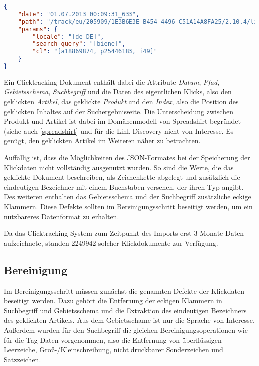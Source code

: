 \begin{lstlisting}[language=json, label={lst:click_raw}, caption={Clicktracking - Rohdokument als JSON}]
{
    "date": "01.07.2013 00:09:31_633",
    "path": "/track/eu/205909/1E3B6E3E-B454-4496-C51A14A8FA25/2.10.4/list",
    "params": {
        "locale": "[de_DE]",
        "search-query": "[biene]",
        "cl": "[a18869874, p25446183, i49]"
    }
}
\end{lstlisting}

Ein Clicktracking-Dokument enthält dabei die Attribute \emph{Datum}, \emph{Pfad}, \emph{Gebietsschema}, \emph{Suchbegriff} und die Daten des eigentlichen Klicks, also den geklickten \emph{Artikel}, das geklickte \emph{Produkt} und den \emph{Index}, also die Position des geklickten Inhaltes auf der Suchergebnisseite. Die Unterscheidung zwischen Produkt und Artikel ist dabei im Domänenmodell von Spreadshirt begründet (siehe auch \ref{spreadshirt} und für die Link Discovery nicht von Interesse. Es genügt, den geklickten Artikel im Weiteren näher zu betrachten.

Auffällig ist, dass die Möglichkeiten des JSON-Formates bei der Speicherung der Klickdaten nicht vollständig ausgenutzt wurden. So sind die Werte, die das geklickte Dokument beschreiben, als Zeichenkette abgelegt und zusätzlich die eindeutigen Bezeichner mit einem Buchstaben versehen, der ihren Typ angibt. Des weiteren enthalten  das Gebietsschema und der Suchbegriff zusätzliche eckige Klammern. Diese Defekte sollten im Bereinigungsschritt beseitigt werden, um ein nutzbareres Datenformat zu erhalten.

Da das Clicktracking-System zum Zeitpunkt des Imports erst 3 Monate Daten aufzeichnete, standen \num{2249942} solcher Klickdokumente zur Verfügung.

\subsection{Bereinigung}

Im Bereinigungsschritt müssen zunächst die genannten Defekte der Klickdaten beseitigt werden. Dazu gehört die Entfernung der eckigen Klammern in Suchbegriff und Gebietsschema und die Extraktion des eindeutigen Bezeichners des geklickten Artikels. Aus dem Gebietsschame ist nur die Sprache von Interesse. Außerdem wurden für den Suchbegriff die gleichen Bereinigungsoperationen wie für die Tag-Daten vorgenommen, also die Entfernung von überflüssigen Leerzeiche, Groß-/Kleinschreibung, nicht druckbarer Sonderzeichen und Satzzeichen.

